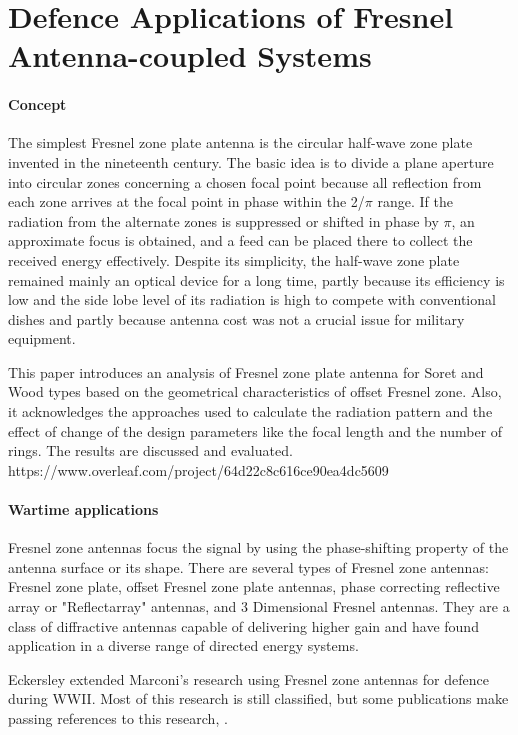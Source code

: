 \documentclass[review]{elsarticle}
\begin{document}
\linenumbers

\section{Defence Applications of Fresnel Antenna-coupled Systems}

\paragraph{Concept} The simplest Fresnel zone plate antenna is the circular half-wave zone plate invented in the nineteenth century. The basic idea is to divide a plane aperture into circular zones concerning a chosen focal point because all reflection from each zone arrives at the focal point in phase within the  2/$\pi$  range. If the radiation from the alternate zones is suppressed or shifted in phase by $\pi$, an approximate focus is obtained, and a feed can be placed there to collect the received energy effectively. Despite its simplicity, the half-wave zone plate remained mainly an optical device for a long time, partly because its efficiency is low and the side lobe level of its radiation is high to compete with conventional dishes and partly because antenna cost was not a crucial issue for military equipment. 

This paper introduces an analysis of Fresnel zone plate antenna for Soret and Wood types based on the geometrical characteristics of offset Fresnel zone. Also, it acknowledges the approaches used to calculate the radiation pattern and the effect of change of the design parameters like the focal length and the number of rings. The results are discussed and evaluated.
https://www.overleaf.com/project/64d22c8c616ce90ea4dc5609
\paragraph{Wartime applications} Fresnel zone antennas focus the signal by using the phase-shifting property of the antenna surface or its shape.   There are several types of Fresnel zone antennas: Fresnel zone plate, offset Fresnel zone plate antennas, phase correcting reflective array or "Reflectarray" antennas, and 3 Dimensional Fresnel antennas. They are a class of diffractive antennas capable of delivering higher gain and have found application in a diverse range of directed energy systems.

Eckersley extended Marconi's research using Fresnel zone antennas for defence during WWII. Most of this research is still classified, but some publications make passing references to this research\cite{Eckersley192706}, \cite{Eckersley194007}.   
\end{document}
